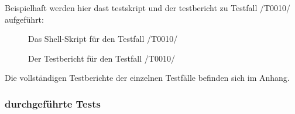 \documentclass[11pt,a4paper]{scrartcl}
\begin{document}
Beispielhaft werden hier dast testskript und der testbericht zu Testfall /T0010/ aufgeführt:

\begin{figure}[H]
\caption{Das Shell-Skript für den Testfall /T0010/}
\end{figure}

\begin{figure}[H]
\caption{Der Testbericht für den Testfall /T0010/}
\end{figure}

Die vollständigen Testberichte der einzelnen Testfälle befinden sich im Anhang.

\newpage

\subsubsection{durchgeführte Tests}
\end{document}
